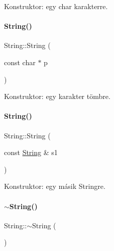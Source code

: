Konstruktor\+: egy char karakterre. 

\mbox{\label{class_string_a09ca4f1436a83ecb1c273a836b7cd4c6}} 
\paragraph{\texorpdfstring{String()}{String()}\hspace{0.1cm}{\footnotesize\ttfamily [3/4]}}
{\footnotesize\ttfamily String\+::\+String (\begin{DoxyParamCaption}\item[{const char $\ast$}]{p }\end{DoxyParamCaption})}



Konstruktor\+: egy karakter tömbre. 

\mbox{\label{class_string_a3c682dc983b45bdbb7f3858fe4cbf221}} 
\paragraph{\texorpdfstring{String()}{String()}\hspace{0.1cm}{\footnotesize\ttfamily [4/4]}}
{\footnotesize\ttfamily String\+::\+String (\begin{DoxyParamCaption}\item[{const \mbox{\hyperlink{class_string}{String}} \&}]{s1 }\end{DoxyParamCaption})}



Konstruktor\+: egy másik Stringre. 

\mbox{\label{class_string_ac40b2a3fb58c2d8556f5e6ff73510036}} 
\paragraph{\texorpdfstring{$\sim$String()}{~String()}}
{\footnotesize\ttfamily String\+::$\sim$\+String (\begin{DoxyParamCaption}{ }\end{DoxyParamCaption})\hspace{0.3cm}{\ttfamily [inline]}}



